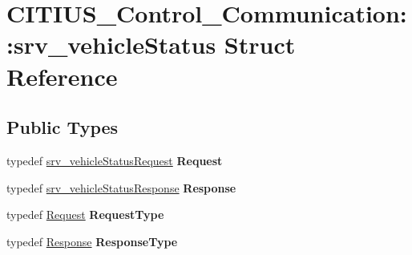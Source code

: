 \hypertarget{struct_c_i_t_i_u_s___control___communication_1_1srv__vehicle_status}{\section{\-C\-I\-T\-I\-U\-S\-\_\-\-Control\-\_\-\-Communication\-:\-:srv\-\_\-vehicle\-Status \-Struct \-Reference}
\label{struct_c_i_t_i_u_s___control___communication_1_1srv__vehicle_status}
}
\subsection*{\-Public \-Types}
\begin{DoxyCompactItemize}
\item 
\hypertarget{struct_c_i_t_i_u_s___control___communication_1_1srv__vehicle_status_a8a23f620a821a29ebdde21a79bb3aeee}{typedef \hyperlink{struct_c_i_t_i_u_s___control___communication_1_1srv__vehicle_status_request__}{srv\-\_\-vehicle\-Status\-Request} {\bfseries \-Request}}\label{struct_c_i_t_i_u_s___control___communication_1_1srv__vehicle_status_a8a23f620a821a29ebdde21a79bb3aeee}

\item 
\hypertarget{struct_c_i_t_i_u_s___control___communication_1_1srv__vehicle_status_ac3994efff6d25478d92b36b897d724a2}{typedef \hyperlink{struct_c_i_t_i_u_s___control___communication_1_1srv__vehicle_status_response__}{srv\-\_\-vehicle\-Status\-Response} {\bfseries \-Response}}\label{struct_c_i_t_i_u_s___control___communication_1_1srv__vehicle_status_ac3994efff6d25478d92b36b897d724a2}

\item 
\hypertarget{struct_c_i_t_i_u_s___control___communication_1_1srv__vehicle_status_a64104ca6fd02afd3a2afd8291ad4ea48}{typedef \hyperlink{struct_c_i_t_i_u_s___control___communication_1_1srv__vehicle_status_request__}{\-Request} {\bfseries \-Request\-Type}}\label{struct_c_i_t_i_u_s___control___communication_1_1srv__vehicle_status_a64104ca6fd02afd3a2afd8291ad4ea48}

\item 
\hypertarget{struct_c_i_t_i_u_s___control___communication_1_1srv__vehicle_status_a308d5c7d1b3f1302a2b0b25016471a2c}{typedef \hyperlink{struct_c_i_t_i_u_s___control___communication_1_1srv__vehicle_status_response__}{\-Response} {\bfseries \-Response\-Type}}\label{struct_c_i_t_i_u_s___control___communication_1_1srv__vehicle_status_a308d5c7d1b3f1302a2b0b25016471a2c}

\end{DoxyCompactItemize}
